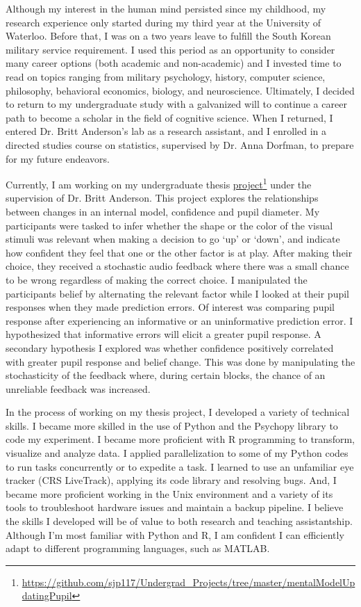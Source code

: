 \documentclass[12pt]{article}
\begin{document}
Although my interest in the human mind persisted since my childhood, my research experience only started during my third year at the University of Waterloo. Before that, I was on a two years leave to fulfill the South Korean military service requirement. I used this period as an opportunity to consider many career options (both academic and non-academic) and I invested time to read on topics ranging from military psychology, history, computer science, philosophy, behavioral economics, biology, and neuroscience. Ultimately, I decided to return to my undergraduate study with a galvanized will to continue a career path to become a scholar in the field of cognitive science. When I returned, I entered Dr. Britt Anderson’s lab as a research assistant, and I enrolled in a directed studies course on statistics, supervised by Dr. Anna Dorfman, to prepare for my future endeavors.

Currently, I am working on my undergraduate thesis \href{https://github.com/sjp117/Undergrad_Projects/tree/master/mentalModelUpdatingPupil}{project}\footnote{\url{https://github.com/sjp117/Undergrad\_Projects/tree/master/mentalModelUpdatingPupil}} under the supervision of Dr. Britt Anderson. This project explores the relationships between changes in an internal model, confidence and pupil diameter. My participants were tasked to infer whether the shape or the color of the visual stimuli was relevant when making a decision to go `up' or `down', and indicate how confident they feel that one or the other factor is at play. After making their choice, they received a stochastic audio feedback where there was a small chance to be wrong regardless of making the correct choice. I manipulated the participants belief by alternating the relevant factor while I looked at their pupil responses when they made prediction errors. Of interest was comparing pupil response after experiencing an informative or an uninformative prediction error. I hypothesized that informative errors will elicit a greater pupil response. A secondary hypothesis I explored was whether confidence positively correlated with greater pupil response and belief change. This was done by manipulating the stochasticity of the feedback where, during certain blocks, the chance of an unreliable feedback was increased.

In the process of working on my thesis project, I developed a variety of technical skills. I became more skilled in the use of Python and the Psychopy library to code my experiment. I became more proficient with R programming to transform, visualize and analyze data. I applied parallelization to some of my Python codes to run tasks concurrently or to expedite a task. I learned to use an unfamiliar eye tracker (CRS LiveTrack), applying its code library and resolving bugs. And, I became more proficient working in the Unix environment and a variety of its tools to troubleshoot hardware issues and maintain a backup pipeline. I believe the skills I developed will be of value to both research and teaching assistantship. Although I’m most familiar with Python and R, I am confident I can efficiently adapt to different programming languages, such as MATLAB.
\end{document}
